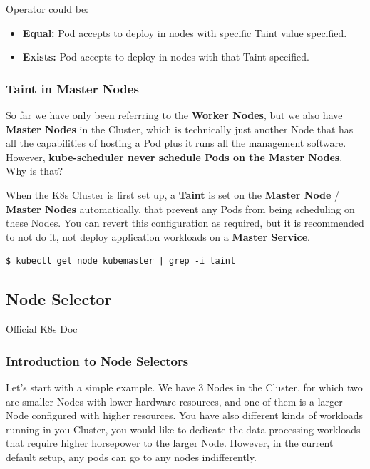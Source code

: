 \documentclass{article}
\newenvironment{codetemplate}[1][]{%
  \mybasecolorbox[#1]
  \itshape
}{%
  \endmybasecolorbox
}
\begin{document}
Operator could be:
\begin{itemize}
    \item \textbf{Equal:} Pod accepts to deploy in nodes with specific Taint value specified.
    \item \textbf{Exists:} Pod accepts to deploy in nodes with that Taint specified.
\end{itemize}

\subsubsection{Taint in Master Nodes}

So far we have only been referrring to the \textbf{Worker Nodes}, but we also have \textbf{Master Nodes} in the Cluster, which is technically just another Node that has all the capabilities of hosting a Pod plus it runs all the management software. However, \textbf{kube-scheduler never schedule Pods on the Master Nodes}. Why is that?

When the K8s Cluster is first set up, a \textbf{Taint} is set on the \textbf{Master Node} / \textbf{Master Nodes} automatically, that prevent any Pods from being scheduling on these Nodes. You can revert this configuration as required, but it is recommended to not do it, not deploy application workloads on a \textbf{Master Service}.

\begin{codetemplate}{}
\begin{verbatim}
$ kubectl get node kubemaster | grep -i taint
\end{verbatim}
\end{codetemplate}

\subsection{Node Selector}

\href{https://kubernetes.io/docs/concepts/scheduling-eviction/assign-pod-node/}{Official K8s Doc}

\subsubsection{Introduction to Node Selectors}

Let's start with a simple example. We have 3 Nodes in the Cluster, for which two are smaller Nodes with lower hardware resources, and one of them is a larger Node configured with higher resources. You have also different kinds of workloads running in you Cluster, you would like to dedicate the data processing workloads that require higher horsepower to the larger Node. However, in the current default setup, any pods can go to any nodes indifferently.
\end{document}
